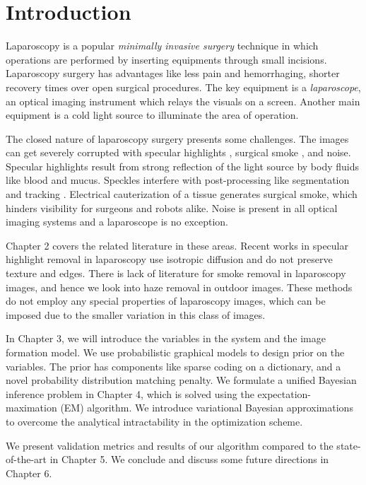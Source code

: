
\newcommand{\etas}{\ensuremath{\eta_{\mathrm{s}}}}


\chapter{Introduction}

Laparoscopy is a popular \emph{minimally invasive surgery} technique in which operations are performed by inserting equipments through small incisions. Laparoscopy surgery has advantages like less pain and hemorrhaging, shorter recovery times over open surgical procedures. The key equipment is a \emph{laparoscope}, an optical imaging instrument which relays the visuals on a screen. Another main equipment is a cold light source to illuminate the area of operation.

The closed nature of laparoscopy surgery presents some challenges. The images can get severely corrupted with specular highlights \cite{stoyanov2005removing, saint2011detection}, surgical smoke \cite{barrett2003surgical}, and noise. Specular highlights result from strong reflection of the light source by body fluids like blood and mucus. Speckles interfere with post-processing like segmentation \cite{prokopetc2015segmentation, voros2007segmentation} and tracking \cite{wolf2011tracking}. Electrical cauterization of a tissue generates surgical smoke, which hinders visibility for surgeons and robots alike. Noise is present in all optical imaging systems and a laparoscope is no exception.

Chapter 2 covers the related literature in these areas. Recent works in specular highlight removal in laparoscopy use isotropic diffusion and do not preserve texture and edges. There is lack of literature for smoke removal in laparoscopy images, and hence we look into haze removal in outdoor images. These methods do not employ any special properties of laparoscopy images, which can be imposed due to the smaller variation in this class of images.

In Chapter 3, we will introduce the variables in the system and the image formation model. We use probabilistic graphical models to design prior on the variables. The prior has components like sparse coding on a dictionary, and a novel probability distribution matching penalty. We formulate a unified Bayesian inference problem in Chapter 4, which is solved using the expectation-maximation (EM) algorithm. We introduce variational Bayesian approximations to overcome the analytical intractability in the optimization scheme. 

We present validation metrics and results of our algorithm compared to the state-of-the-art in Chapter 5. We conclude and discuss some future directions in Chapter 6.







